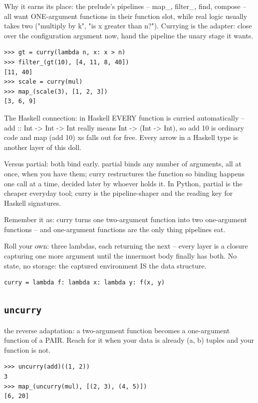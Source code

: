 \documentclass[10pt,letterpaper]{book}
\begin{document}
Why it earns its place: the prelude's pipelines -- map\_, filter\_, find, compose -- all want ONE-argument functions in their function slot, while real logic usually takes two ("multiply by k", "is x greater than n?"). Currying is the adapter: close over the configuration argument now, hand the pipeline the unary stage it wants.

\begin{lstlisting}[style=ex]
>>> gt = curry(lambda n, x: x > n)
>>> filter_(gt(10), [4, 11, 8, 40])
[11, 40]
>>> scale = curry(mul)
>>> map_(scale(3), [1, 2, 3])
[3, 6, 9]
\end{lstlisting}

The Haskell connection: in Haskell EVERY function is curried automatically -- add :: Int -> Int -> Int really means Int -> (Int -> Int), so add 10 is ordinary code and map (add 10) xs falls out for free. Every arrow in a Haskell type is another layer of this doll.


Versus partial: both bind early. partial binds any number of arguments, all at once, when you have them; curry restructures the function so binding happens one call at a time, decided later by whoever holds it. In Python, partial is the cheaper everyday tool; curry is the pipeline-shaper and the reading key for Haskell signatures.


Remember it as: curry turns one two-argument function into two one-argument functions -- and one-argument functions are the only thing pipelines eat.


Roll your own: three lambdas, each returning the next -- every layer is a closure capturing one more argument until the innermost body finally has both. No state, no storage: the captured environment IS the data structure.

\begin{lstlisting}[style=ex]
curry = lambda f: lambda x: lambda y: f(x, y)
\end{lstlisting}
\subsection{\texttt{uncurry}}\label{def:uncurry}
the reverse adaptation: a two-argument function becomes a one-argument function of a PAIR. Reach for it when your data is already (a, b) tuples and your function is not.
\begin{lstlisting}[style=ex]
>>> uncurry(add)((1, 2))
3
>>> map_(uncurry(mul), [(2, 3), (4, 5)])
[6, 20]
\end{lstlisting}
\end{document}
